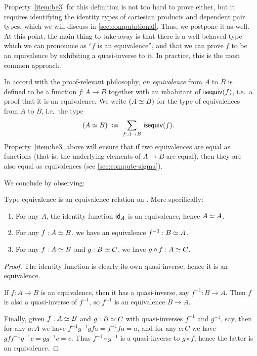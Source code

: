 Property~\ref{item:be3} for this definition is not too hard to prove either, but it requires identifying the identity types of cartesian products and dependent pair types, which we will discuss in \autoref{sec:computational}.
Thus, we postpone it as well.
At this point, the main thing to take away is that there is a well-behaved type which we can pronounce as ``$f$ is an equivalence'', and that we can prove $f$ to be an equivalence by exhibiting a quasi-inverse to it.
In practice, this is the most common approach.

In accord with the proof-relevant philosophy, \emph{an equivalence} from $A$ to $B$ is defined to be a function $f:A\to B$ together with an inhabitant of $\isequiv (f)$, i.e.\ a proof that it is an equivalence.
We write $(\eqv A B)$ for the type of equivalences from $A$ to $B$, i.e.\ the type
\[ (\eqv A B) \;\defeq \; \sm{f:A\to B} \isequiv(f). \]
Property~\ref{item:be3} above will ensure that if two equivalences are equal as functions (that is, the underlying elements of $A\to B$ are equal), then they are also equal as equivalences (see \autoref{sec:compute-sigma}).

We conclude by observing:

\begin{lem}\label{thm:equiv-eqrel}
  Type equivalence is an equivalence relation on \type.
  More specifically:
  \begin{enumerate}
  \item For any $A$, the identity function $\idfunc[A]$ is an equivalence; hence $\eqv A A$.
  \item For any $f:\eqv A B$, we have an equivalence $f^{-1} : \eqv B A$.
  \item For any $f:\eqv A B$ and $g:\eqv B C$, we have $g\circ f : \eqv A C$.
  \end{enumerate}
\end{lem}
\begin{proof}
  The identity function is clearly its own quasi-inverse; hence it is an equivalence.

  If $f:A\to B$ is an equivalence, then it has a quasi-inverse, say $f^{-1}:B\to A$.
  Then $f$ is also a quasi-inverse of $f^{-1}$, so $f^{-1}$ is an equivalence $B\to A$.

  Finally, given $f:\eqv A B$ and $g:\eqv B C$ with quasi-inverses $f^{-1}$ and $g^{-1}$, say, then for any $a:A$ we have $f^{-1} g^{-1} g f a = f^{-1} f a = a$, and for any $c:C$ we have $g f f^{-1} g^{-1} c = g g^{-1} c = c$.
  Thus $f^{-1} \circ g^{-1}$ is a quasi-inverse to $g\circ f$, hence the latter is an equivalence.
\end{proof}


